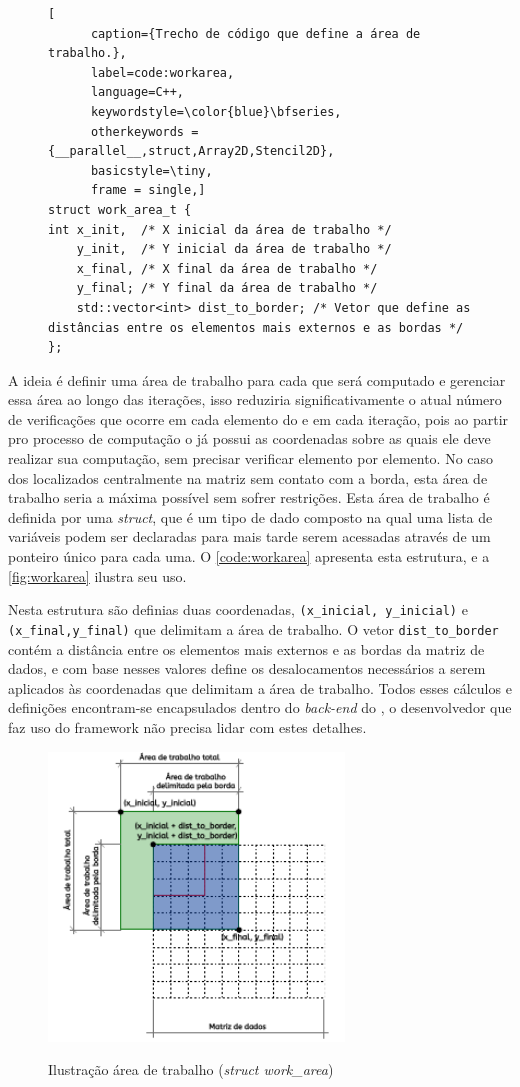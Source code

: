 \begin{figure}
  \begin{lstlisting}[
      caption={Trecho de código que define a área de trabalho.}, 
      label=code:workarea,
      language=C++,
      keywordstyle=\color{blue}\bfseries,
      otherkeywords = {__parallel__,struct,Array2D,Stencil2D}, 
      basicstyle=\tiny, 
      frame = single,]
struct work_area_t {
int x_init,  /* X inicial da área de trabalho */
    y_init,  /* Y inicial da área de trabalho */
    x_final, /* X final da área de trabalho */
    y_final; /* Y final da área de trabalho */
    std::vector<int> dist_to_border; /* Vetor que define as distâncias entre os elementos mais externos e as bordas */
};
  \end{lstlisting}
\end{figure}

A ideia é definir uma área de trabalho para cada \tile que será computado e gerenciar essa área ao longo das iterações, isso reduziria significativamente o atual número de verificações que ocorre em cada elemento do \tile e em cada iteração, pois ao partir pro processo de computação o \cluster já possui as coordenadas sobre as quais ele deve realizar sua computação, sem precisar verificar elemento por elemento. No caso dos \tiles localizados centralmente na matriz sem contato com a borda, esta área de trabalho seria a máxima possível sem sofrer restrições.
Esta área de trabalho é definida por uma \textit{struct}, que é um tipo de dado composto na qual uma lista de variáveis podem ser declaradas para mais tarde serem acessadas através de um ponteiro único para cada uma. O \autoref{code:workarea} apresenta esta estrutura, e a \autoref{fig:workarea} ilustra seu uso.

Nesta estrutura são definias duas coordenadas, \texttt{(x\_inicial, y\_inicial)} e \texttt{(x\_final,y\_final)} que delimitam a área de trabalho. O vetor \texttt{dist\_to\_border} contém a distância entre os elementos mais externos e as bordas da matriz de dados, e com base nesses valores define os desalocamentos necessários a serem aplicados às coordenadas que delimitam a área de trabalho. Todos esses cálculos e definições encontram-se encapsulados dentro do \textit{back-end} do \pskelmppa \async, o desenvolvedor que faz uso do framework não precisa lidar com estes detalhes. 

\begin{figure}
  \centering
  \caption{Ilustração área de trabalho (\textit{struct work\_area})}
  \includegraphics[width=0.7\textwidth]{figs/work_area.pdf}
  \label{fig:workarea}
\end{figure}

